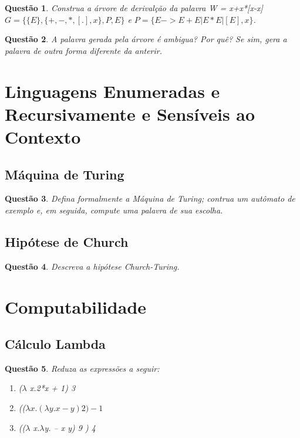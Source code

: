 \documentclass{article}
\newtheorem{problem}{Questão}
\begin{document}
    \begin{problem}
         Construa a árvore de derivalção da palavra W = x+x*[x-x] $G = \{ \{E\},\{+,-,*,[.],x\},P,E\}$ e $P = \{ E -> E+E | E*E | [E] , x\}$.  
    \end{problem}
    \begin{solution}
        
    \end{solution}
    \begin{problem}
         A palavra gerada pela árvore é ambigua? Por quê? Se sim, gera a palavra de outra forma diferente da anterir.  
    \end{problem}
\begin{solution}
        
    \end{solution}
\section{Linguagens Enumeradas e Recursivamente e Sensíveis ao Contexto}

    \subsection{Máquina de Turing}
        \begin{problem}
                Defina formalmente a Máquina de Turing; contrua um autômato de exemplo e, em seguida, compute uma palavra de sua escolha.
        \end{problem}
        \begin{solution}
        
    \end{solution}
    \subsection{Hipótese de Church}
        \begin{problem}
              Descreva a hipótese Church-Turing.
        \end{problem}
        \begin{solution}
        
    \end{solution}
\section{Computabilidade}

    \subsection{Cálculo Lambda}
    \begin{problem}
        Reduza as expressões a seguir:
        \begin{enumerate}[label=(\alph*)]
            \item ($\lambda$ x.2*x + 1) 3
            \item (($\lambda x.(\lambda y.x-y) 2 ) -1$
            \item (($\lambda$ x.$\lambda$y. – x y) 9 ) 4
        \end{enumerate}
    \end{problem}
    
\end{document}
